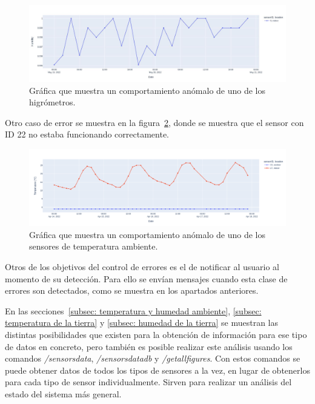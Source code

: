 \documentclass[a4paper, 12pt, oneside]{book}
\begin{document}
\begin{figure}[H]
	\centering
    \includegraphics[width=12cm, keepaspectratio]{img/problemas_sensor}
    \caption{Gráfica que muestra un comportamiento anómalo de uno de los higrómetros.}
    \label{figura:sensor_problemas_higro}
\end{figure}

Otro caso de error se muestra en la figura~\ref{figura:error temperatura ambiente}, donde se muestra que el sensor con ID 22 no estaba funcionando correctamente.

\begin{figure}[H]
	\centering
    \includegraphics[width=12cm, keepaspectratio]{img/ambient_temperature_error}
    \caption{Gráfica que muestra un comportamiento anómalo de uno de los sensores de temperatura ambiente.}
    \label{figura:error temperatura ambiente}
\end{figure}

Otros de los objetivos del control de errores es el de notificar al usuario al momento de su detección. Para ello se envían mensajes cuando esta clase de errores son detectados, como se muestra en los apartados anteriores.

En las secciones~\ref{subsec: temperatura y humedad ambiente}, \ref{subsec: temperatura de la tierra} y \ref{subsec: humedad de la tierra} se muestran las distintas posibilidades que existen para la obtención de información para ese tipo de datos en concreto, pero también es posible realizar este análisis usando los comandos \textit{/sensorsdata}, \textit{/sensorsdatadb} y \textit{/getallfigures}. Con estos comandos se puede obtener datos de todos los tipos de sensores a la vez, en lugar de obtenerlos para cada tipo de sensor individualmente. Sirven para realizar un análisis del estado del sistema más general.
\end{document}
